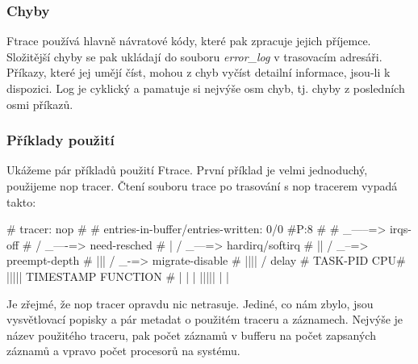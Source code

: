 \subsubsection*{Chyby}

Ftrace používá hlavně návratové kódy, které pak zpracuje jejich příjemce. Složitější chyby se pak ukládají do souboru \emph{error\_log} v trasovacím adresáři. Příkazy, které jej umějí číst, mohou z chyb vyčíst detailní informace, jsou-li k dispozici. Log je cyklický a pamatuje si nejvýše osm chyb, tj. chyby z posledních osmi příkazů.

\subsubsection*{Příklady použití}

Ukážeme pár příkladů použití Ftrace. První příklad je velmi jednoduchý, použijeme nop tracer. Čtení souboru trace po trasování s nop tracerem vypadá takto:
\begin{code}
# tracer: nop
#
# entries-in-buffer/entries-written: 0/0   #P:8
#
#                                _-----=> irqs-off
#                               / _----=> need-resched
#                              | / _---=> hardirq/softirq
#                              || / _--=> preempt-depth
#                              ||| / _-=> migrate-disable
#                              |||| /     delay
#           TASK-PID     CPU#  |||||  TIMESTAMP  FUNCTION
#              | |         |   |||||     |         |
\end{code}
Je zřejmé, že nop tracer opravdu nic netrasuje. Jediné, co nám zbylo, jsou vysvětlovací popisky a pár metadat o použitém traceru a záznamech. Nejvýše je název použitého traceru, pak počet záznamů v bufferu na počet zapsaných záznamů a vpravo počet procesorů na systému.

